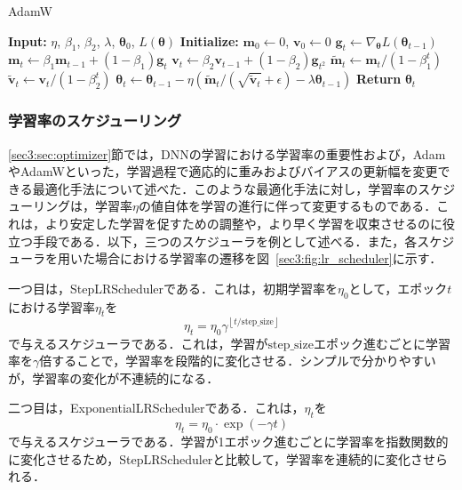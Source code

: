 \documentclass[12pt]{jarticle}
\numberwithin{equation}{section}    %
\numberwithin{figure}{section}      %
\numberwithin{table}{section}      %
\begin{document}
\begin{algorithm}
    \caption{AdamW}
    \label{sec3:algo:adamw}
    \begin{algorithmic}[1]
        \State \textbf{Input:} $\eta$, $\beta_{1}$, $\beta_{2}$, $\lambda$, $\bm{\theta}_{0}$, $L(\bm{\theta})$
        \State \textbf{Initialize:} $\bm{m}_{0} \gets 0$, $\bm{v}_{0} \gets 0$
        \State $\bm{g}_{t} \gets \nabla_{\bm{\theta}} L(\bm{\theta}_{t-1})$
        \State $\bm{m}_{t} \gets \beta_{1} \bm{m}_{t-1} + (1 - \beta_{1}) \bm{g}_{t}$
        \State $\bm{v}_{t} \gets \beta_{2} \bm{v}_{t-1} + (1 - \beta_{2}) \bm{g}_{t^{2}}$
        \State $\tilde{\bm{m}}_{t} \gets \bm{m}_{t} / (1 - \beta_{1}^{t})$
        \State $\tilde{\bm{v}}_{t} \gets \bm{v}_{t} / (1 - \beta_{2}^{t})$
        \State $\bm{\theta}_{t} \gets \bm{\theta}_{t-1} - \eta (\tilde{\bm{m}}_{t} / (\sqrt{\tilde{\bm{v}}_{t}} + \epsilon) - \lambda \bm{\theta}_{t - 1})$
        \EndFor
        \State \textbf{Return} $\bm{\theta}_{t}$
    \end{algorithmic}
\end{algorithm}

\subsubsection{学習率のスケジューリング}
\ref{sec3:sec:optimizer}節では，DNNの学習における学習率の重要性および，AdamやAdamWといった，学習過程で適応的に重みおよびバイアスの更新幅を変更できる最適化手法について述べた．このような最適化手法に対し，学習率のスケジューリングは，学習率$\eta$の値自体を学習の進行に伴って変更するものである．これは，より安定した学習を促すための調整や，より早く学習を収束させるのに役立つ手段である．以下，三つのスケジューラを例として述べる．また，各スケジューラを用いた場合における学習率の遷移を図~\ref{sec3:fig:lr_scheduler}に示す．

一つ目は，StepLRSchedulerである．これは，初期学習率を$\eta_{0}$として，エポック$t$における学習率$\eta_{t}$を
\begin{equation}
    \eta_{t} = \eta_{0} \gamma^{\left\lfloor t / \text{step\_size} \right\rfloor}
\end{equation}
で与えるスケジューラである．これは，学習が$\text{step\_size}$エポック進むごとに学習率を$\gamma$倍することで，学習率を段階的に変化させる．シンプルで分かりやすいが，学習率の変化が不連続的になる．

二つ目は，ExponentialLRSchedulerである．これは，$\eta_{t}$を
\begin{equation}
    \eta_{t} = \eta_{0} \cdot \exp \left( -\gamma t \right)
\end{equation}
で与えるスケジューラである．学習が1エポック進むごとに学習率を指数関数的に変化させるため，StepLRSchedulerと比較して，学習率を連続的に変化させられる．
\end{document}
